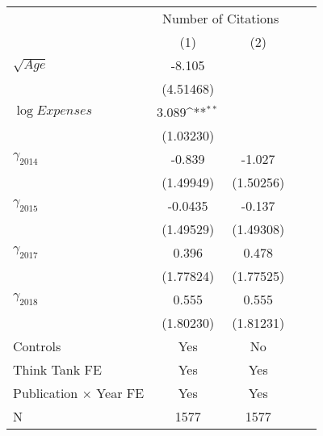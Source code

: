 \def\sym#1{\ifmmode^{#1}\else\(^{#1}\)\fi}
\setlength\tabcolsep{17pt}
\begin{tabular}{@{\extracolsep{7pt}}lcccc}
\toprule
                    &\multicolumn{2}{c}{Number of Citations}    \\\cmidrule(lr){2-3}
                    &\multicolumn{1}{c}{(1)}         &\multicolumn{1}{c}{(2)}         \\
\midrule
$\sqrt{Age}$        &      -8.105         &                     \\
                    &   (4.51468)         &                     \\
\addlinespace
$\log{Expenses}$    &       3.089\sym{**} &                     \\
                    &   (1.03230)         &                     \\
\addlinespace
\large $\gamma_{2014}$&      -0.839         &      -1.027         \\
                    &   (1.49949)         &   (1.50256)         \\
\addlinespace
\large $\gamma_{2015}$&     -0.0435         &      -0.137         \\
                    &   (1.49529)         &   (1.49308)         \\
\addlinespace
\large $\gamma_{2017}$&       0.396         &       0.478         \\
                    &   (1.77824)         &   (1.77525)         \\
\addlinespace
\large $\gamma_{2018}$&       0.555         &       0.555         \\
                    &   (1.80230)         &   (1.81231)         \\
\midrule
Controls            &         Yes         &          No         \\
Think Tank FE       &         Yes         &         Yes         \\
Publication $\times$ Year FE&         Yes         &         Yes         \\
N                   &        1577         &        1577         \\
\bottomrule
\end{tabular}
